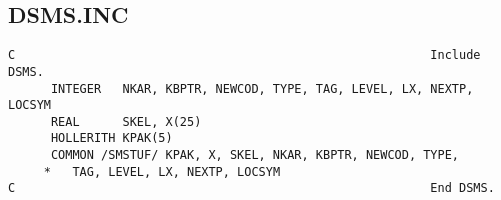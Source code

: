 \subsection{DSMS.INC}

\begin{verbatim}
C                                                          Include DSMS.
      INTEGER   NKAR, KBPTR, NEWCOD, TYPE, TAG, LEVEL, LX, NEXTP, LOCSYM
      REAL      SKEL, X(25)
      HOLLERITH KPAK(5)
      COMMON /SMSTUF/ KPAK, X, SKEL, NKAR, KBPTR, NEWCOD, TYPE,
     *   TAG, LEVEL, LX, NEXTP, LOCSYM
C                                                          End DSMS.

\end{verbatim}
